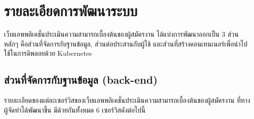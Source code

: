 \section{รายละเอียดการพัฒนาระบบ}

เว็บแอพพลิเคชั่นประเมินความสามารถเบื้องต้นของผู้สมัครงาน ได้แบ่งการพัฒนาออกเป็น 3 ส่วนหลักๆ คือส่วนที่จัดการกับฐานข้อมูล, ส่วนต่อประสานกับผู้ใช้ และส่วนที่สร้างคอนเทนเนอร์เพื่อนำไปใช้ในการดิพลอยด้วย Kubernetes

\subsection{ส่วนที่จัดการกับฐานข้อมูล (back-end)}

รายละเอียดของแต่ละเซอร์วิสของเว็บแอพพลิเคชั่นประเมินความสามารถเบื้องต้นของผู้สมัครงาน ที่ทางผู้จัดทำได้พัฒนาขึ้น มีด้วยกันทั้งหมด 6 เซอร์วิสดังต่อไปนี้


